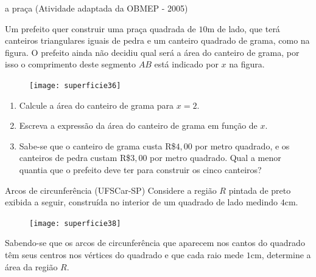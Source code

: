 \begin{task}{a praça}
(Atividade adaptada da OBMEP - 2005)

Um prefeito quer construir uma praça quadrada de $10$m de lado, que terá canteiros triangulares iguais de pedra e um canteiro quadrado de grama, como na figura. O prefeito ainda não decidiu qual será a área do canteiro de grama, por isso o comprimento deste segmento $AB$ está indicado por $x$ na figura.

\begin{figure}[H]
\centering

\texttt{[image: superficie36]}
\end{figure}
\clearpage
\begin{enumerate}
  \item Calcule a área do canteiro de grama para $x=2$.
  \item Escreva a expressão da área do canteiro de grama em função de $x$.
  \item Sabe-se que o canteiro de grama custa R\$$4{,}00$ por metro quadrado, e os canteiros de pedra custam R\$$3{,}00$ por metro quadrado. Qual a menor quantia que o prefeito deve ter para construir os cinco canteiros?
\end{enumerate}
\end{task}

\clearpage
\begin{task}{Arcos de circunferência}
(UFSCar-SP) Considere a região $R$ pintada de preto exibida a seguir, construída no interior de um quadrado de lado medindo $4$cm.

\begin{figure}[H]
\centering

\texttt{[image: superficie38]}
\end{figure}

Sabendo-se que os arcos de circunferência que aparecem nos cantos do quadrado têm seus centros nos vértices do quadrado e que cada raio mede $1$cm, determine a área da região $R$.
\end{task}


